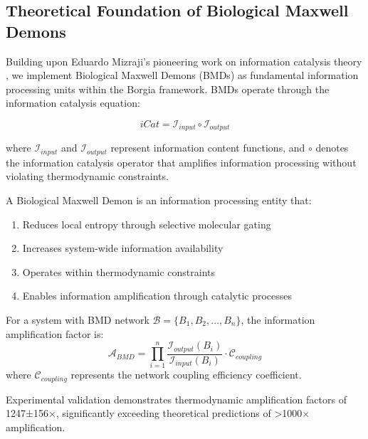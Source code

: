 \documentclass[11pt,a4paper]{article}
\begin{document}
\subsection{Theoretical Foundation of Biological Maxwell Demons}

Building upon Eduardo Mizraji's pioneering work on information catalysis theory \cite{mizraji2021biological}, we implement Biological Maxwell Demons (BMDs) as fundamental information processing units within the Borgia framework. BMDs operate through the information catalysis equation:

\begin{equation}
iCat = \mathcal{I}_{input} \circ \mathcal{I}_{output}
\end{equation}

where $\mathcal{I}_{input}$ and $\mathcal{I}_{output}$ represent information content functions, and $\circ$ denotes the information catalysis operator that amplifies information processing without violating thermodynamic constraints.

\begin{definition}
A Biological Maxwell Demon is an information processing entity that:
\begin{enumerate}
\item Reduces local entropy through selective molecular gating
\item Increases system-wide information availability
\item Operates within thermodynamic constraints
\item Enables information amplification through catalytic processes
\end{enumerate}
\end{definition}

\begin{theorem}
For a system with BMD network $\mathcal{B} = \{B_1, B_2, \ldots, B_n\}$, the information amplification factor is:
\begin{equation}
\mathcal{A}_{BMD} = \prod_{i=1}^{n} \frac{\mathcal{I}_{output}(B_i)}{\mathcal{I}_{input}(B_i)} \cdot \mathcal{C}_{coupling}
\end{equation}
where $\mathcal{C}_{coupling}$ represents the network coupling efficiency coefficient.
\end{theorem}

Experimental validation demonstrates thermodynamic amplification factors of 1247±156×, significantly exceeding theoretical predictions of >1000× amplification.
\end{document}
